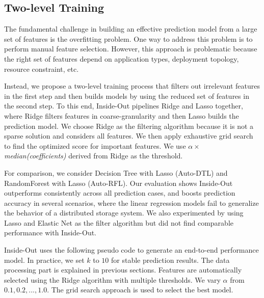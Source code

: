 \subsection{Two-level Training}
\label{sec:auto_feature_selection}

The fundamental challenge 
in building an effective prediction model from a large set of features is the overfitting problem.
One way to address this problem is to perform manual feature selection.
However, this approach is problematic because the right set of features depend on application types, 
deployment topology, resource constraint, etc.

Instead, we propose a two-level training process that filters out irrelevant features in the first step 
and then builds models by using the reduced set of features in the second step.
To this end, Inside-Out pipelines Ridge and Lasso together, where Ridge filters features in 
coarse-granularity and then Lasso builds the prediction model.
We choose Ridge as the filtering algorithm because it is not a sparse solution and considers all features. 
We then apply exhaustive grid search to find the optimized score for important features.
We use $\alpha \times$ \textit{median(coefficients)} derived from Ridge as the threshold.

For comparison, we consider Decision Tree with Lasso (Auto-DTL) and RandomForest with Lasso (Auto-RFL).
Our evaluation shows Inside-Out outperforms consistently across all prediction cases, 
and boosts prediction accuracy in several scenarios, where the linear regression models 
fail to generalize the behavior of a distributed storage system.
We also experimented by using Lasso and Elastic Net as the filter algorithm but did not find comparable performance with Inside-Out.

Inside-Out uses the following pseudo code to generate an end-to-end performance model.
In practice, we set $k$ to $10$ for stable prediction results.
The data processing part is explained in previous sections.
Features are automatically selected using the Ridge algorithm
with multiple thresholds.
We vary $\alpha$ from $0.1, 0.2, ..., 1.0$.
The grid search approach is used to select the best model.



